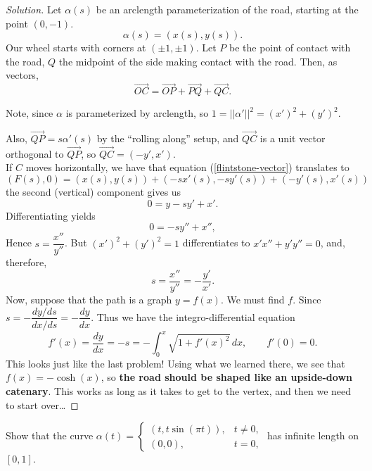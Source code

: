 \documentclass[Shifrin_Solutions_Spring_2015]{subfiles}
\begin{document}
\begin{proof}[Solution]
Let $\alpha(s)$ be an arclength parameterization of the road, starting at the point $(0,-1)$.
\[
\alpha(s) = ( x(s), y(s) ).
\]
Our wheel starts with corners at $(\pm 1, \pm 1)$. Let $P$ be the point of contact with the road, $Q$ the midpoint of the side making contact with the road. Then, as vectors,
\begin{equation}\label{flintstone-vector}
\overrightarrow{OC} = \overrightarrow{OP} + \overrightarrow{PQ} + \overrightarrow{QC}.
\end{equation}

Note, since $\alpha$ is parameterized by arclength, so $1=||\alpha'||^2=(x')^2+(y')^2$.

Also, $\overrightarrow{QP} = s\alpha'(s)$ by the ``rolling along'' setup, and $\overrightarrow{QC}$ is a unit vector orthogonal to $\overrightarrow{QP}$, so $\overrightarrow{QC} = (-y', x')$.\\

If $C$ moves horizontally, we have that equation (\ref{flintstone-vector}) translates to
\[
(F(s), 0 ) = (x(s), y(s) ) + (-s x'(s) , -sy'(s) ) + (-y'(s), x'(s) )
\]
the second (vertical) component gives us
\[
0 = y -s y' + x' .
\]
Differentiating yields
\[
0 = -s y'' + x'' ,
\]
Hence $s = \dfrac{x''}{y''}$.  But $(x')^2 + (y')^2 = 1$ differentiates to $x'x'' + y' y'' = 0$, and, therefore,
\[
s = \dfrac{x''}{y''} = - \dfrac{y'}{x'} .
\]
Now, suppose that the path is a graph $y=f(x)$. We must find $f$. Since $s = - \dfrac{dy/ds}{dx/ds} = -\dfrac{dy}{dx}$. Thus we have the integro-differential equation
\[
f'(x) = \dfrac{dy}{dx} = -s = - \int_0^x \sqrt{1 + f'(x)^2 }\, dx, \qquad f'(0) = 0.
\]
This looks just like the last problem! Using what we learned there, we see that $f(x) = -\cosh(x)$, so \textbf{the road should be shaped like an upside-down catenary}. This works as long as it takes to get to the vertex, and then we need to start over\dots
\end{proof}




\begin{exercise}
Show that the curve $\alpha(t) = \left\{ \begin{matrix}\left(t, t \sin(\pi t)\right), & t \neq 0, \\ (0,0), & t = 0, \end{matrix} \right. $ has infinite length on $[0,1]$.
\end{exercise}
\end{document}
